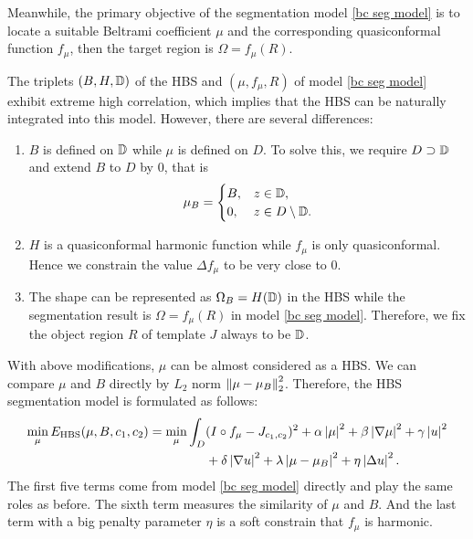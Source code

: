 \documentclass[review,onefignum,onetabnum]{siamonline190516}
\begin{document}
Meanwhile, the primary objective of the segmentation model \ref{bc seg model} is to locate a suitable Beltrami coefficient $\mu$ and the corresponding quasiconformal function $f_\mu$, then the target region is $\Omega = f_\mu(R)$. 

The triplets $(B, H, \mathbb{D})$ of the HBS and $(\mu, f_\mu, R)$ of model \ref{bc seg model} exhibit extreme high correlation, which implies that the HBS can be naturally integrated into this model. However, there are several differences:
\begin{enumerate}
    \item $B$ is defined on $\mathbb{D}$ while $\mu$ is defined on $D$. To solve this, we require $D \supset \mathbb{D}$ and extend $B$ to $D$ by $0$, that is
          \begin{equation}\label{mu_B}
              \mu_B = \begin{cases}
                  B, & z \in \D,              \\
                  0, & z \in D \setminus \D.
              \end{cases}
          \end{equation}
          
    \item $H$ is a quasiconformal harmonic function while $f_\mu$ is only quasiconformal. Hence we constrain the value $\Delta f_\mu$ to be very close to $0$.
          
    \item The shape can be represented as $\Omega_B = H(\mathbb{D})$ in the HBS while the segmentation result is $\Omega = f_\mu(R)$ in model \ref{bc seg model}. Therefore, we fix the object region $R$ of template $J$ always to be $\mathbb{D}$.
\end{enumerate}

With above modifications, $\mu$ can be almost considered as a HBS. We can compare  $\mu$ and $B$ directly by $L_2$ norm $\left\Vert \mu - \mu_B \right\Vert^2_2$. Therefore, the HBS segmentation model is formulated as follows:
\begin{equation}\label{hbs seg model}
    \begin{split}
        \min_{\mu} E_{\text{HBS}}(\mu, B, c_1, c_2) = 
        \min_{\mu} \int_D 
        & (I \circ f_\mu - J_{c_1,c_2})^2 
        + \alpha \abs{\mu}^2 + \beta \abs{\nabla \mu}^2 
        + \gamma \abs{u}^2 \\
        & + \delta \abs{\nabla u}^2
        + \lambda \abs{\mu - \mu_B}^2 + \eta \abs{\Delta u}^2.
    \end{split}
\end{equation}
The first five terms come from model \ref{bc seg model} directly and play the same roles as before. The sixth term measures the similarity of $\mu$ and $B$. And the last term with a big penalty parameter $\eta$ is a soft constrain that $f_\mu$ is harmonic.
\end{document}
